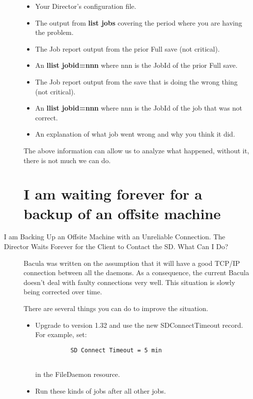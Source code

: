 \begin{description}
\begin{itemize}
\item Your Director's configuration file.  
\item The output from {\bf list jobs} covering the period where you  are
   having the problem.  
\item The Job report output from the prior Full save (not critical).  
\item An {\bf llist jobid=nnn} where nnn is the JobId of the prior  Full save.
 
\item The Job report output from the save that is doing the  wrong thing (not
   critical).  
\item An {\bf llist jobid=nnn} where nnn is the JobId of the job  that was not
   correct.  
\item An explanation of what job went wrong and why you think it did.  
   \end{itemize}

The above information can allow us to analyze what happened, without it, 
there is not much we can do.  

\label{WaitForever}
\section{I am waiting forever for a backup of an offsite machine}
\item [I am Backing Up an Offsite Machine with an Unreliable Connection.
   The  Director Waits Forever for the Client to Contact the SD. What Can  I
   Do?]
   Bacula was written on the assumption that it will have a good TCP/IP
   connection between all the daemons.  As a consequence, the current
   Bacula doesn't deal with faulty connections very well.  This situation
   is slowly being corrected over time.
   
   There are several things you can do to improve the situation.  

\begin{itemize}
\item Upgrade to version 1.32 and use the new SDConnectTimeout record.  For
   example, set:  

\footnotesize
\begin{verbatim}
          SD Connect Timeout = 5 min
          
\end{verbatim}
\normalsize

in the FileDaemon resource.  
\item Run these kinds of jobs after all other jobs.  
   \end{itemize}


\end{description}
